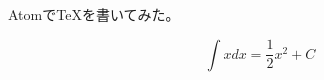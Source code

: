 \documentclass[dvipdfmx,uplatex]{jsarticle}
\title{}
\author{}
\date{\today}
\begin{document}
\maketitle
\setcounter{tocdepth}{3}
\tableofcontents
\listoffigures
\listoftables


AtomでTeXを書いてみた。

\begin{equation}
  \int x dx = \frac{1}{2}x^2 + C
\end{equation}
\end{document}
